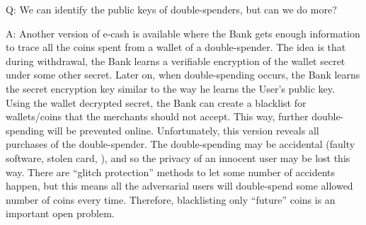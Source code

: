 Q: We can identify the public keys of double-spenders, but can we do more?

\noindent A: Another version of e-cash is available where the Bank gets enough information to trace all the coins spent from a wallet of a double-spender. The idea is that during withdrawal, the Bank learns a verifiable encryption of the wallet secret under some other secret. Later on, when double-spending occurs, the Bank learns the secret encryption key similar to the way he learns the User's public key. Using the wallet decrypted secret, the Bank can create a blacklist for wallets/coins that the merchants should not accept. This way, further double-spending will be prevented online. Unfortunately, this version reveals all purchases of the double-spender. The double-spending may be accidental (faulty software, stolen card, \etc), and so the privacy of an innocent user may be lost this way. There are ``glitch protection'' methods \cite{cloneWars} to let some number of accidents happen, but this means all the adversarial users will double-spend some allowed number of coins every time. Therefore, blacklisting only ``future'' coins is an important open problem.
